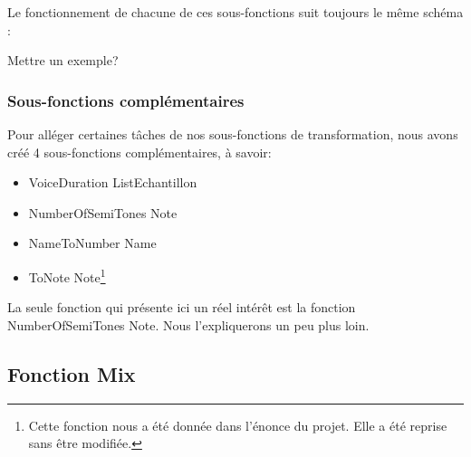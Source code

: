 \documentclass[10pt,a4paper]{article}
\begin{document}
Le fonctionnement  de chacune de ces sous-fonctions suit toujours le même schéma :

Mettre un exemple?

\subsubsection{Sous-fonctions complémentaires}
Pour alléger certaines tâches de nos sous-fonctions de transformation,  nous avons créé 4 sous-fonctions complémentaires, à savoir:
\begin{itemize}
	\item {VoiceDuration ListEchantillon}
	\item {NumberOfSemiTones Note}
	\item {NameToNumber Name}
	\item {ToNote Note}\footnote{Cette fonction nous a été donnée dans l'énonce du projet. Elle a été reprise sans être modifiée.}
\end{itemize}

La seule fonction qui présente ici un réel intérêt est la fonction {NumberOfSemiTones Note}. Nous l'expliquerons un peu plus loin.

\subsection{Fonction Mix}
\end{document}
